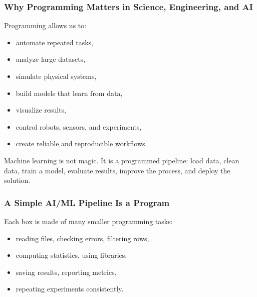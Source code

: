\documentclass[aspectratio=169,10pt]{beamer}
\newcommand{\myitem}[1]{\item #1\vspace{0.04cm}}
\begin{document}
\begin{frame}
\frametitle{Why Programming Matters in Science, Engineering, and AI}
\vspace{0.25cm}
{\large Programming allows us to:}
\vspace{0.15cm}
\begin{itemize}
  \myitem{automate repeated tasks,}
  \myitem{analyze large datasets,}
  \myitem{simulate physical systems,}
  \myitem{build models that learn from data,}
  \myitem{visualize results,}
  \myitem{control robots, sensors, and experiments,}
  \myitem{create reliable and reproducible workflows.}
\end{itemize}

\vspace{0.15cm}
\begin{tcolorbox}[lecturebox,title=AI/ML connection]
Machine learning is not magic. It is a programmed pipeline: load data, clean data, train a model, evaluate results, improve the process, and deploy the solution.
\end{tcolorbox}
\end{frame}


\begin{frame}
\frametitle{A Simple AI/ML Pipeline Is a Program}
\vspace{0.9cm}
\centering
{}

\vspace{0.8cm}
\raggedright
{\large Each box is made of many smaller programming tasks:}
\vspace{0.15cm}
\begin{itemize}
  \myitem{reading files, checking errors, filtering rows,}
  \myitem{computing statistics, using libraries,}
  \myitem{saving results, reporting metrics,}
  \myitem{repeating experiments consistently.}
\end{itemize}
\end{frame}
\end{document}
